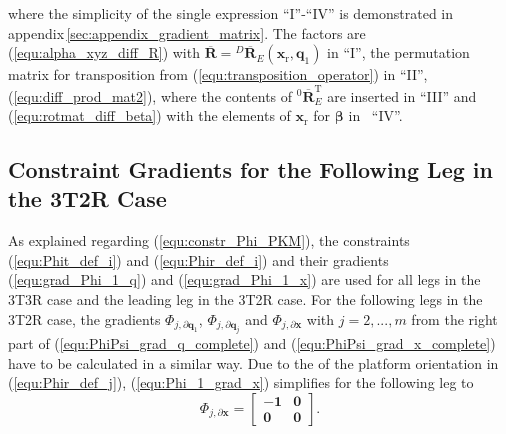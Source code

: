 \documentclass[robotics,article,accept,moreauthors,pdftex]{Definitions/mdpi}
\newcommand{\bm}[1]{\boldsymbol{#1}}
\newcommand{\rotmato}[2]{{{ }^{#1}\boldsymbol{\overline{R}}}_{#2}}
\newcommand{\transp}[0]{{\mathrm{T}}}
\let\Phi\varPhi
\begin{document}
%
where the simplicity of the single expression ``I''-``IV'' is demonstrated in appendix\,\ref{sec:appendix_gradient_matrix}.
The factors are~
(\ref{equ:alpha_xyz_diff_R}) with $\overline{\bm{R}}=\rotmato{D}{E}(\bm{x}_{\mathrm{r}},\bm{q}_1)$ in ``I'',
the permutation matrix for transposition from (\ref{equ:transposition_operator}) in ``II'',~
(\ref{equ:diff_prod_mat2}), where the contents of $\rotmato{0}{E}^\transp$ are inserted in ``III'' and
(\ref{equ:rotmat_diff_beta}) with the elements of $\bm{x}_{\mathrm{r}}$ for $\bm{\beta}$ in~ ``IV''.

\subsection{Constraint Gradients for the Following Leg in the 3T2R Case}

As explained regarding (\ref{equ:constr_Phi_PKM}), the constraints (\ref{equ:Phit_def_i}) and (\ref{equ:Phir_def_i}) and their gradients (\ref{equ:grad_Phi_1_q}) and (\ref{equ:grad_Phi_1_x}) are used for all legs in the 3T3R case and the leading leg in the 3T2R case.
For the following legs in the 3T2R case, the gradients $\bm{\Phi}_{j,\partial\bm{q}_1}$, $\bm{\Phi}_{j,\partial\bm{q}_j}$ and $\bm{\Phi}_{j,\partial\bm{x}}$ with $j=2,...,m$ from the right part of (\ref{equ:PhiPsi_grad_q_complete}) and (\ref{equ:PhiPsi_grad_x_complete}) have to be calculated in a similar way. 
Due to the  of the platform orientation in (\ref{equ:Phir_def_j}), (\ref{equ:Phi_1_grad_x}) simplifies for the following leg to 
%
\vspace{-0.1cm}
\begin{equation}
\bm{\Phi}_{j,\partial\bm{x}}
=
\begin{bmatrix}
-\bm{1} & \bm{0} \\
\bm{0} & \bm{0}
\end{bmatrix}.
\end{equation}
%
\end{document}
